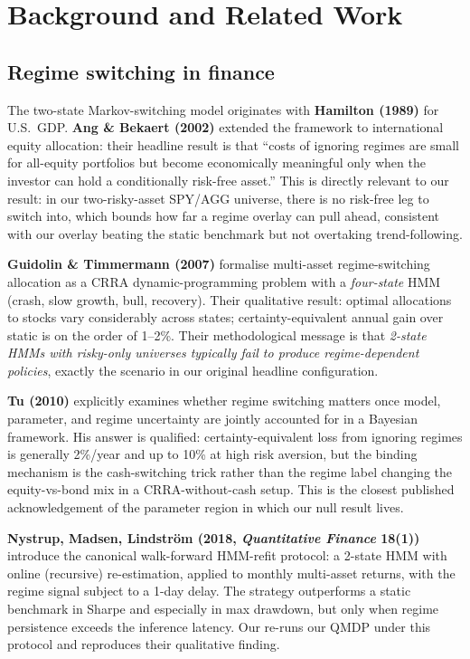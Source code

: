 \documentclass[11pt]{article}
\theoremstyle{plain1}
\theoremstyle{definition1}
\newcommand{\1}{\mathbf{1}}
\begin{document}
\section{Background and Related Work}\label{sec:related}

\subsection{Regime switching in finance}

The two-state Markov-switching model originates with \textbf{Hamilton (1989)} for U.S.\ GDP. \textbf{Ang \& Bekaert (2002)} extended the framework to international equity allocation: their headline result is that ``costs of ignoring regimes are small for all-equity portfolios but become economically meaningful only when the investor can hold a conditionally risk-free asset.'' This is directly relevant to our result: in our two-risky-asset SPY/AGG universe, there is no risk-free leg to switch into, which bounds how far a regime overlay can pull ahead, consistent with our overlay beating the static benchmark but not overtaking trend-following.

\textbf{Guidolin \& Timmermann (2007)} formalise multi-asset regime-switching allocation as a CRRA dynamic-programming problem with a \emph{four-state} HMM (crash, slow growth, bull, recovery). Their qualitative result: optimal allocations to stocks vary considerably across states; certainty-equivalent annual gain over static is on the order of 1--2\%. Their methodological message is that \emph{2-state HMMs with risky-only universes typically fail to produce regime-dependent policies}, exactly the scenario in our original headline configuration.

\textbf{Tu (2010)} explicitly examines whether regime switching matters once model, parameter, and regime uncertainty are jointly accounted for in a Bayesian framework. His answer is qualified: certainty-equivalent loss from ignoring regimes is generally 2\%/year and up to 10\% at high risk aversion, but the binding mechanism is the cash-switching trick rather than the regime label changing the equity-vs-bond mix in a CRRA-without-cash setup. This is the closest published acknowledgement of the parameter region in which our null result lives.

\textbf{Nystrup, Madsen, Lindstr\"om (2018, \emph{Quantitative Finance} 18(1))} introduce the canonical walk-forward HMM-refit protocol: a 2-state HMM with online (recursive) re-estimation, applied to monthly multi-asset returns, with the regime signal subject to a 1-day delay. The strategy outperforms a static benchmark in Sharpe and especially in max drawdown, but only when regime persistence exceeds the inference latency. Our  re-runs our QMDP under this protocol and reproduces their qualitative finding.
\end{document}
